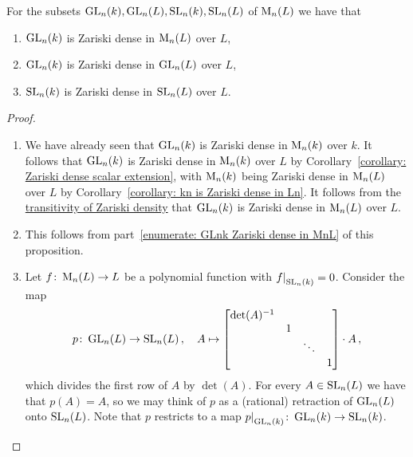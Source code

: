 \begin{proposition}
  \leavevmode
  For the subsets $\operatorname{GL}_n(k), \operatorname{GL}_n(L), \operatorname{SL}_n(k), \operatorname{SL}_n(L)$ of $\operatorname{M}_n(L)$ we have that
  \begin{enumerate}
    \item
      \label{enumerate: GLnk Zariski dense in MnL}
      $\operatorname{GL}_n(k)$ is Zariski dense in $\operatorname{M}_n(L)$ over $L$,
    \item
      $\operatorname{GL}_n(k)$ is Zariski dense in $\operatorname{GL}_n(L)$ over $L$,
    \item
      $\operatorname{SL}_n(k)$ is Zariski dense in $\operatorname{SL}_n(L)$ over $L$.
  \end{enumerate}
\end{proposition}
\begin{proof}
  \leavevmode
  \begin{enumerate}
    \item
      We have already seen that $\operatorname{GL}_n(k)$ is Zariski dense in $\operatorname{M}_n(k)$ over $k$.
      It follows that $\operatorname{GL}_n(k)$ is Zariski dense in $\operatorname{M}_n(k)$ over $L$ by Corollary~\ref{corollary: Zariski dense scalar extension}, with $\operatorname{M}_n(k)$ being Zariski dense in $\operatorname{M}_n(L)$ over $L$ by Corollary~\ref{corollary: kn is Zariski dense in Ln}.
      It follows from the \hyperref[lemma: transitivity of Zariski density]{transitivity of Zariski density} that $\operatorname{GL}_n(k)$ is Zariski dense in $\operatorname{M}_n(L)$ over $L$.
    \item
      This follows from part~\ref*{enumerate: GLnk Zariski dense in MnL} of this proposition.
    \item
      Let $f \colon \operatorname{M}_n(L) \to L$ be a polynomial function with $\restrict{f}{\SL_n(k)} = 0$.
      Consider the map
      \[
                p
        \colon  \operatorname{GL}_n(L)
        \to     \operatorname{SL}_n(L) \,,
        \quad   A
        \mapsto \begin{bmatrix}
                  \det(A)^{-1}  &   &         &     \\
                                & 1 &         &     \\
                                &   & \ddots  &     \\
                                &   &         & 1
                \end{bmatrix}
                \cdot
                A \,,
      \]
      which divides the first row of $A$ by $\det(A)$.
      For every $A \in \operatorname{SL}_n(L)$ we have that $p(A) = A$, so we may think of $p$ as a (rational) retraction of $\operatorname{GL}_n(L)$ onto $\operatorname{SL}_n(L)$.
      Note that $p$ restricts to a map $\restrict{p}{\GL_n(k)} \colon \GL_n(k) \to \SL_n(k)$.
      

\end{enumerate}
\end{proof}
